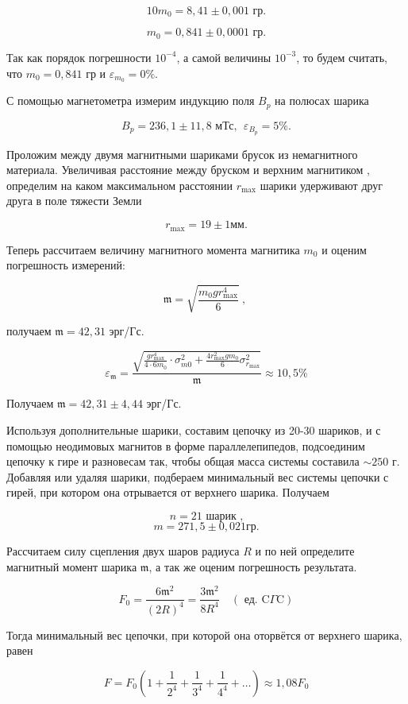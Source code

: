 \documentclass[a4paper, 12pt]{article}%
\begin{document}
\[  10m_0 =	8,41 \pm 0,001	\text{ гр} .\]

\[  m_0 =	0,841 \pm 0,0001	\text{ гр} .\]

Так как порядок погрешности $10^{-4}$, а самой величины $10^{-3}$, то будем считать, что $m_0 = 0,841 \text{ гр}$ и  $\varepsilon_{m_0} = 0\% $.

С помощью магнетометра измерим индукцию поля $B_p$ на полюсах шарика

\[ B_p = 236,1 \pm 11,8	\text{ мТс}, \ \ \varepsilon_{B_p} = 5 \%.\]

Проложим между двумя магнитными шариками брусок из немагнитного материала. Увеличивая расстояние между бруском и верхним магнитиком , определим на каком максимальном расстоянии $r_{\max }$ шарики удерживают друг друга в поле тяжести Земли

\[ r_{\max} = 19 \pm 1 \text{мм} .\]

Теперь рассчитаем величину магнитного момента магнитика $m_0$ и оценим погрешность измерений:

\[ \mathfrak{m}=\sqrt{\frac{m_0 g r_{\max }^{4}}{6}}\ ,\ \]

получаем $\mathfrak{m} = 42,31$  эрг/Гс.

\[ \varepsilon_{\mathfrak{m}} = \frac{\sqrt{\frac{g r_{\max }^{4}}{4 \cdot 6 m_{0}} \cdot \sigma_{m 0}^{2}+\frac{4 r_{\max }^{2} g m_{0}}{6} \sigma_{r_{\max }}^{2}}}{\mathfrak{m}} \approx 10,5\% \]

Получаем $\mathfrak{m} = 42,31 \pm 4,44$  эрг/Гс.

Используя дополнительные шарики, составим цепочку из 20-30 шариков, и с помощью неодимовых магнитов в форме параллелепипедов, подсоединим цепочку к гире и разновесам так, чтобы общая масса системы составила $\sim 250$ г. Добавляя или удаляя шарики, подбераем минимальный вес системы цепочки с гирей, при котором она отрывается от верхнего шарика. Получаем

\[ n = 21	\text{ шарик ,}\]
\[ m = 271,5 \pm 0,021 гр .\]

Рассчитаем силу сцепления двух шаров радиуса $R$ и по ней определите магнитный момент шарика $\mathfrak{m}$, а так же оценим погрешность результата.

\[ F_{0}=\frac{6 \mathfrak{m}^{2}}{(2 R)^{4}}=\frac{3 \mathfrak{m}^{2}}{8 R^{4}} \quad(\text { ед. } \mathrm{C} \Gamma \mathrm{C}) \]

Тогда минимальный вес цепочки, при которой она оторвётся от верхнего шарика, равен

\[F=F_{0}\left(1+\frac{1}{2^{4}}+\frac{1}{3^{4}}+\frac{1}{4^{4}}+\ldots\right) \approx 1,08 F_{0}\]
\end{document}
